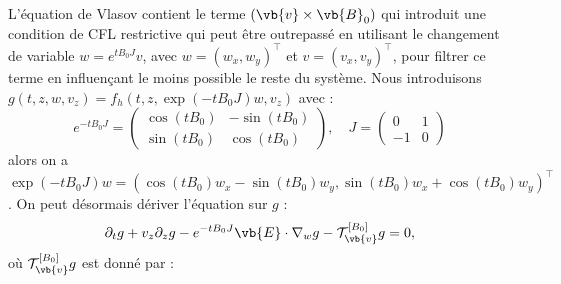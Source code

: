 L'équation de Vlasov contient le terme $(\vb{v}\times\vb{B}_0)$ qui introduit une condition de CFL restrictive qui peut être outrepassé en utilisant le changement de variable $w=e^{tB_0J}v$, avec $w=(w_x,w_y)^\top$ et $v=(v_x,v_y)^\top$, pour filtrer ce terme en influençant le moins possible le reste du système. Nous introduisons $g(t,z,w,v_z) = f_h(t,z,\exp(-tB_0J)w,v_z)$ avec :
$$
  e^{-tB_0J} = \begin{pmatrix}
    \cos(tB_0) & -\sin(tB_0) \\
    \sin(tB_0) &  \cos(tB_0)
  \end{pmatrix},
  \quad
  J = \begin{pmatrix}
    0  & 1 \\
    -1 & 0
  \end{pmatrix}
$$
alors on a $\exp(-tB_0J)w = \left( \cos(tB_0)w_x - \sin(tB_0)w_y , \sin(tB_0)w_x + \cos(tB_0)w_y \right)^\top$. On peut désormais dériver l'équation sur $g$ :
\begin{equation}
  \partial_t g + v_z\partial_z g - e^{-tB_0J}\vb{E}\cdot\nabla_w g - \mathcal{T}_{\vb{v}}^{[B_0]}g = 0,
\end{equation}
où $\mathcal{T}_{\vb{v}}^{[B_0]}g$ est donné par :
